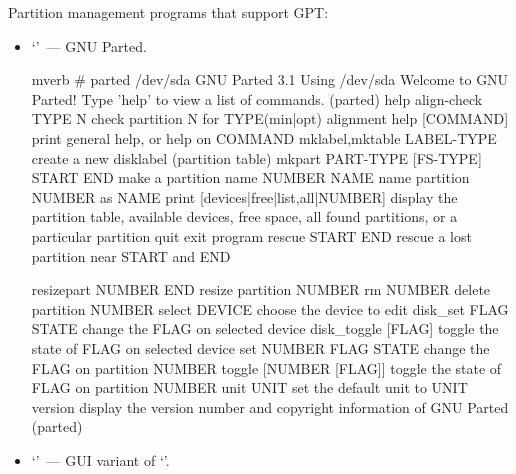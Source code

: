 Partition management programs that support GPT:
\begin{itemize}
\item `'~--- GNU Parted.
\begin{code}{mverb}
#  parted /dev/sda
GNU Parted 3.1
Using /dev/sda
Welcome to GNU Parted! Type 'help' to view a list of commands.
(parted) help
  align-check TYPE N                        check partition N for TYPE(min|opt) alignment
  help [COMMAND]                           print general help, or help on COMMAND
  mklabel,mktable LABEL-TYPE               create a new disklabel (partition table)
  mkpart PART-TYPE [FS-TYPE] START END     make a partition
  name NUMBER NAME                         name partition NUMBER as NAME
  print [devices|free|list,all|NUMBER]     display the partition table, available devices, free space, all found
        partitions, or a particular partition
  quit                                     exit program
  rescue START END                         rescue a lost partition near START and END

  resizepart NUMBER END                    resize partition NUMBER
  rm NUMBER                                delete partition NUMBER
  select DEVICE                            choose the device to edit
  disk_set FLAG STATE                      change the FLAG on selected device
  disk_toggle [FLAG]                       toggle the state of FLAG on selected device
  set NUMBER FLAG STATE                    change the FLAG on partition NUMBER
  toggle [NUMBER [FLAG]]                   toggle the state of FLAG on partition NUMBER
  unit UNIT                                set the default unit to UNIT
  version                                  display the version number and copyright information of GNU Parted
(parted)
\end{code}
\item `'~--- GUI variant of `'.
\end{itemize}

